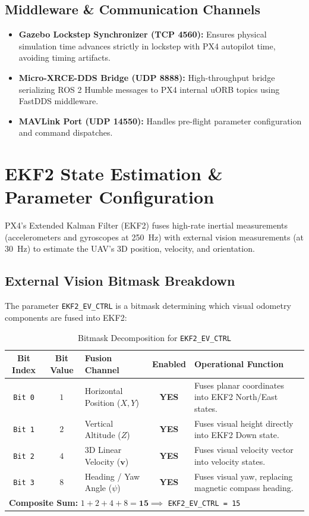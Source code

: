 \documentclass[11pt,a4paper]{article}
\begin{document}
\subsection{Middleware \& Communication Channels}
\begin{itemize}[leftmargin=1.5em, itemsep=3pt]
  \item \textbf{Gazebo Lockstep Synchronizer (TCP 4560):} Ensures physical simulation time advances strictly in lockstep with PX4 autopilot time, avoiding timing artifacts.
  \item \textbf{Micro-XRCE-DDS Bridge (UDP 8888):} High-throughput bridge serializing ROS 2 Humble messages to PX4 internal uORB topics using FastDDS middleware.
  \item \textbf{MAVLink Port (UDP 14550):} Handles pre-flight parameter configuration and command dispatches.
\end{itemize}

\section{EKF2 State Estimation \& Parameter Configuration}

PX4's Extended Kalman Filter (EKF2) fuses high-rate inertial measurements (accelerometers and gyroscopes at 250~Hz) with external vision measurements (at 30~Hz) to estimate the UAV's 3D position, velocity, and orientation.

\subsection{External Vision Bitmask Breakdown}
The parameter \texttt{EKF2\_EV\_CTRL} is a bitmask determining which visual odometry components are fused into EKF2:

\begin{table}[h!]
\centering
\small
\begin{tabularx}{\textwidth}{c c l c X}
\toprule
\textbf{Bit Index} & \textbf{Bit Value} & \textbf{Fusion Channel} & \textbf{Enabled} & \textbf{Operational Function} \\
\midrule
\texttt{Bit 0} & $1$ & Horizontal Position ($X, Y$) & \textbf{YES} & Fuses planar coordinates into EKF2 North/East states. \\
\texttt{Bit 1} & $2$ & Vertical Altitude ($Z$) & \textbf{YES} & Fuses visual height directly into EKF2 Down state. \\
\texttt{Bit 2} & $4$ & 3D Linear Velocity ($\mathbf{v}$) & \textbf{YES} & Fuses visual velocity vector into velocity states. \\
\texttt{Bit 3} & $8$ & Heading / Yaw Angle ($\psi$) & \textbf{YES} & Fuses visual yaw, replacing magnetic compass heading. \\
\bottomrule
\multicolumn{5}{l}{\textbf{Composite Sum:} $1 + 2 + 4 + 8 = \mathbf{15} \implies$ \texttt{EKF2\_EV\_CTRL = 15}}
\end{tabularx}
\caption{Bitmask Decomposition for \texttt{EKF2\_EV\_CTRL}}
\label{tab:bitmask}
\end{table}
\end{document}
